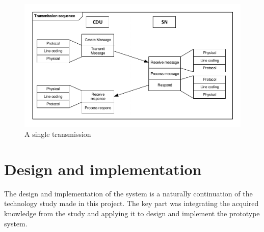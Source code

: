 \begin{figure}[H]
\centering
\includegraphics[width=.8\textwidth]{billeder/11ProjectDescription/singletransmission}
\caption{A single transmission}
\label{fig:sintrans}
\end{figure}

\section{Design and implementation}
The design and implementation of the system is a naturally continuation of the technology study made in this project. The key part was integrating the acquired knowledge from the study and applying it to design and implement the prototype system.\\
